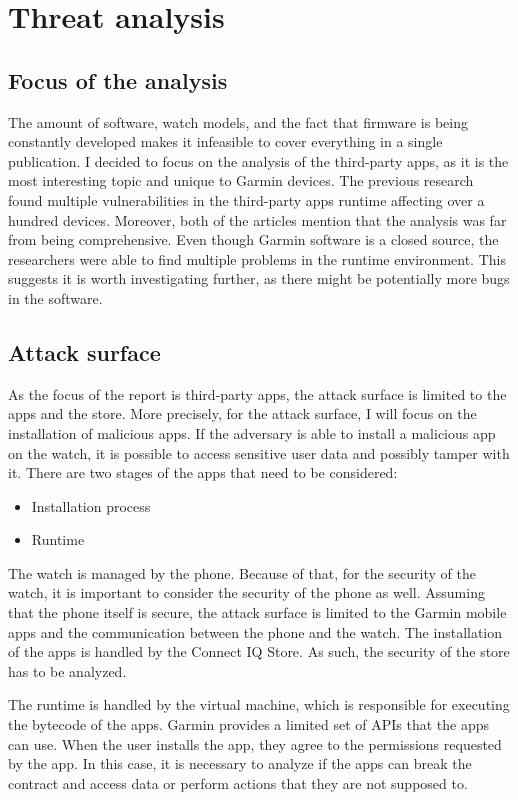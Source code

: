 \chapter{Threat analysis}
\section{Focus of the analysis}
The amount of software, watch models, and the fact that firmware is being constantly developed makes it infeasible to cover everything in a single publication.
I decided to focus on the analysis of the third-party apps, as it is the most interesting topic and unique to Garmin devices.
The previous research found multiple vulnerabilities in the third-party apps runtime affecting over a hundred devices\cite{broken-vm,compromising-garmin-watches}.
Moreover, both of the articles mention that the analysis was far from being comprehensive.
Even though Garmin software is a closed source, the researchers were able to find multiple problems in the runtime environment.
This suggests it is worth investigating further, as there might be potentially more bugs in the software.

\section{Attack surface}
As the focus of the report is third-party apps, the attack surface is limited to the apps and the store.
More precisely, for the attack surface, I will focus on the installation of malicious apps.
If the adversary is able to install a malicious app on the watch, it is possible to access sensitive user data and possibly tamper with it.
There are two stages of the apps that need to be considered:
\begin{itemize}
    \item Installation process
    \item Runtime
\end{itemize}

The watch is managed by the phone.
Because of that, for the security of the watch, it is important to consider the security of the phone as well.
Assuming that the phone itself is secure, the attack surface is limited to the Garmin mobile apps and the communication between the phone and the watch.
The installation of the apps is handled by the Connect IQ Store.
As such, the security of the store has to be analyzed.

The runtime is handled by the virtual machine, which is responsible for executing the bytecode of the apps.
Garmin provides a limited set of APIs that the apps can use.
When the user installs the app, they agree to the permissions requested by the app.
In this case, it is necessary to analyze if the apps can break the contract and access data or perform actions that they are not supposed to.